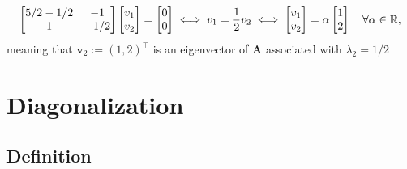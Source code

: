 \documentclass[12pt,a4paper]{article}
\begin{document}
\begin{itemize}
\begin{itemize}
\begin{equation}
      \begin{bmatrix}
        5/2-1/2 & -1 \\
        1 & - 1/2
      \end{bmatrix}
      \begin{bmatrix}
        v_{1} \\
        v_{2} \\
      \end{bmatrix}
      = 
      \begin{bmatrix}
        0 \\
        0 \\
      \end{bmatrix}
      \iff
      v_{1} = \frac{1}{2}v_{2}
      \iff
      \begin{bmatrix}
        v_{1} \\
        v_{2} \\
      \end{bmatrix}
      =
      \alpha
      \begin{bmatrix}
        1\\
        2
      \end{bmatrix}
      \quad \forall \alpha \in \mathbb{R},
    \end{equation}
    meaning that $\bm{v}_{2}:= (1,2)^{\top}$
    is an eigenvector of $\bm{A}$ associated with $\lambda_{2}=1/2$

  \end{itemize}

\end{itemize}

\section{Diagonalization}

\subsection{Definition}
\end{document}
